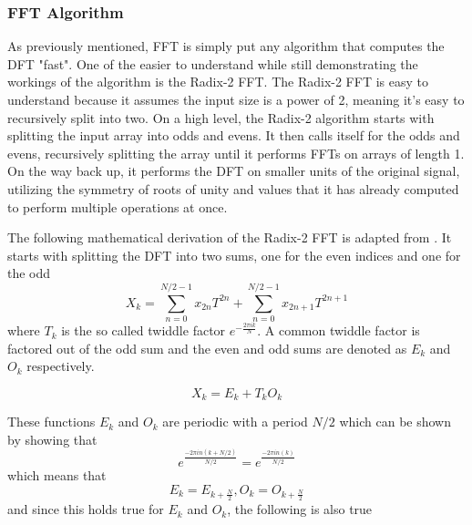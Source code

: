 




\subsubsection{FFT Algorithm}
As previously mentioned, FFT is simply put any algorithm that computes the DFT "fast". One of the easier to understand while still demonstrating the workings of the algorithm is the Radix-2 FFT. The Radix-2 FFT is easy to understand because it assumes the input size is a power of 2, meaning it's easy to recursively split into two. On a high level, the Radix-2 algorithm starts with splitting the input array into odds and evens. It then calls itself for the odds and evens, recursively splitting the array until it performs FFTs on arrays of length 1. On the way back up, it performs the DFT on smaller units of the original signal, utilizing the symmetry of roots of unity and values that it has already computed to perform multiple operations at once. 

The following mathematical derivation of the Radix-2 FFT is adapted from \cite{Rozman2019}. It starts with splitting the DFT into two sums, one for the even indices and one for the odd 
$$X_k = \sum^{N/2-1}_{n=0} x_{2n}T^{2n}+ \sum^{N/2-1}_{n=0} x_{2n+1}T^{2n+1}$$
where $T_k$ is the so called twiddle factor $e^{-\frac{2\pi ik}{N}}$. A common twiddle factor is factored out of the odd sum and the even and odd sums are denoted as $E_k$ and $O_k$ respectively. 

$$X_k = E_k + T_kO_k$$

These functions $E_k$ and $O_k$ are periodic with a period $N/2$ which can be shown by showing that $$e^{\frac{-2\pi in(k+N/2)}{N/2}} = e^{\frac{-2\pi in(k)}{N/2}}$$
which means that 
$$E_k = E_{k+\frac{N}{2}}, O_k = O_{k+\frac{N}{2}}$$
and since this holds true for $E_k$ and $O_k$, the following is also true

